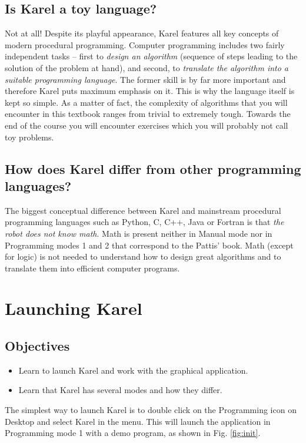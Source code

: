 \subsection{Is Karel a toy language?}

Not at all! Despite its playful appearance, Karel features all key
concepts of modern procedural programming. Computer programming includes two 
fairly independent tasks -- first to {\em design an algorithm} (sequence of 
steps leading to the solution of the problem at hand), and second, to {\em translate 
the algorithm into a suitable programming language}. The former skill is by 
far more important and therefore Karel puts maximum emphasis on it. This is 
why the language itself is kept so simple. As a matter of fact, the complexity 
of algorithms that you will encounter in this textbook ranges from trivial  
to extremely tough. Towards the end of the course you will encounter exercises
which you will probably not call toy problems.

\subsection{How does Karel differ from other programming languages?}

The biggest conceptual difference between Karel and mainstream procedural
programming languages such as Python, C, C++, Java or Fortran is that {\em 
the robot does not know math}. Math is present neither in Manual mode nor 
in Programming modes 1 and 2 that correspond to the Pattis' book. 
Math (except for logic) is not needed to understand how to design great 
algorithms and to translate them into efficient computer programs. 
 
\section{Launching Karel}

\subsection{Objectives} 
\begin{itemize}
\item Learn to launch Karel and work with the graphical application.
\item Learn that Karel has several modes and how they differ.
\end{itemize}
\noindent
The simplest way to launch Karel is to double click on the Programming icon on Desktop 
and select Karel in the menu. This will launch the application in Programming 
mode 1 with a demo program, as shown in Fig. 
\ref{fig:init}.

